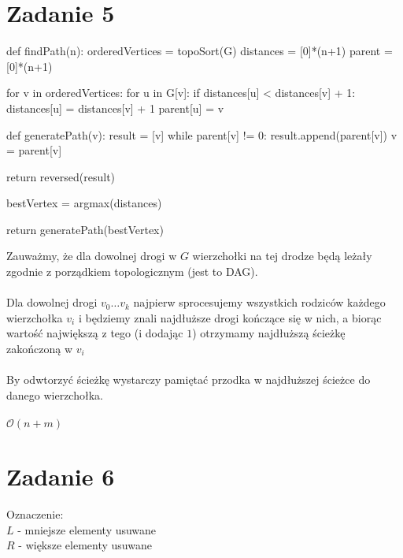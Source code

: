 \documentclass{article}
\begin{document}
\section{Zadanie 5}
\begin{python}
def findPath(n):
    orderedVertices = topoSort(G)
    distances = [0]*(n+1)
    parent = [0]*(n+1)

    for v in orderedVertices:
       for u in G[v]:
          if distances[u] < distances[v] + 1:
             distances[u] = distances[v] + 1
             parent[u] = v

    def generatePath(v):
       result = [v]
       while parent[v] != 0:
         result.append(parent[v])
         v = parent[v]

       return reversed(result)

    bestVertex = argmax(distances)

    return generatePath(bestVertex)
\end{python}
Zauważmy, że dla dowolnej drogi w $G$ wierzchołki na tej drodze będą leżały zgodnie z porządkiem topologicznym (jest to DAG). \\\\Dla dowolnej drogi $v_0 \ldots v_k$ najpierw sprocesujemy wszystkich rodziców każdego wierzchołka $v_i$ i będziemy znali najdłuższe drogi kończące się w nich, a biorąc wartość największą z tego (i dodając $1$) otrzymamy najdłuższą ścieżkę zakończoną w $v_i$\\\\
By odwtorzyć ścieżkę wystarczy pamiętać przodka w najdłuższej ścieżce do danego wierzchołka.\\\\
$\mathcal{O}(n + m)$
\clearpage
\section{Zadanie 6}
Oznaczenie:\\
$L$ - mniejsze elementy usuwane\\
$R$ - większe elementy usuwane
\end{document}
